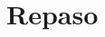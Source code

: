 \documentclass{beamer}
\begin{document}
\section{Repaso} %


\begin{frame}

\end{frame}




\begin{frame}[fragile] %
	
\end{frame}

\end{document}
